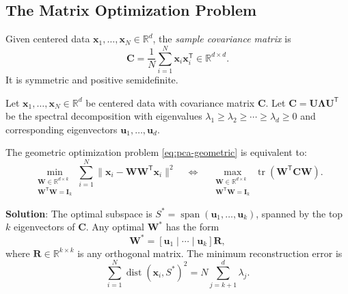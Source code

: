 \subsection{The Matrix Optimization Problem}

\begin{definition}
  Given centered data $\mathbf{x}_1,\dots,\mathbf{x}_N \in \mathbb{R}^d$, the \emph{sample covariance matrix} is
  \begin{equation}
    \mathbf{C} = \frac{1}{N} \sum_{i=1}^{N} \mathbf{x}_i \mathbf{x}_i^{\mathsf{T}} \in \mathbb{R}^{d \times d}.
  \end{equation}
  It is symmetric and positive semidefinite.
\end{definition}

\begin{theorem}\label{thm:pca}
  Let $\mathbf{x}_1,\dots,\mathbf{x}_N \in \mathbb{R}^d$ be centered data with covariance matrix $\mathbf{C}$.
  Let $\mathbf{C} = \mathbf{U}\mathbf{\Lambda}\mathbf{U}^{\mathsf{T}}$ be the spectral decomposition with eigenvalues $\lambda_1 \geq \lambda_2 \geq \cdots \geq \lambda_d \geq 0$ and corresponding eigenvectors $\mathbf{u}_1,\dots,\mathbf{u}_d$.

  The geometric optimization problem \eqref{eq:pca-geometric} is equivalent to:
  \begin{equation}\label{eq:pca-trace}
    \min_{\substack{\mathbf{W} \in \mathbb{R}^{d \times k} \\ \mathbf{W}^{\mathsf{T}}\mathbf{W} = \mathbf{I}_k}} \sum_{i=1}^{N} \|\mathbf{x}_i - \mathbf{W}\mathbf{W}^{\mathsf{T}}\mathbf{x}_i\|^2 \quad \Leftrightarrow \quad \max_{\substack{\mathbf{W} \in \mathbb{R}^{d \times k} \\ \mathbf{W}^{\mathsf{T}}\mathbf{W} = \mathbf{I}_k}} \operatorname{tr}(\mathbf{W}^{\mathsf{T}}\mathbf{C}\mathbf{W}).
  \end{equation}

  \textbf{Solution}: The optimal subspace is $S^* = \operatorname{span}(\mathbf{u}_1,\dots,\mathbf{u}_k)$, spanned by the top $k$ eigenvectors of $\mathbf{C}$.
  Any optimal $\mathbf{W}^*$ has the form
  \begin{equation}
    \mathbf{W}^* = [\mathbf{u}_1 \mid \cdots \mid \mathbf{u}_k] \mathbf{R},
  \end{equation}
  where $\mathbf{R} \in \mathbb{R}^{k \times k}$ is any orthogonal matrix. The minimum reconstruction error is
  \begin{equation}
    \sum_{i=1}^{N} \operatorname{dist}(\mathbf{x}_i, S^*)^2 = N \sum_{j=k+1}^{d} \lambda_j.
  \end{equation}
\end{theorem}

